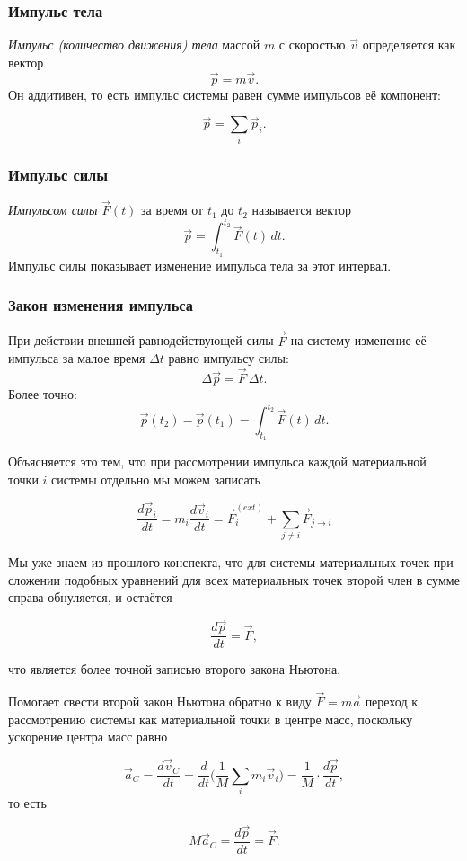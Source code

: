 \documentclass[12pt, a4paper]{article}%
\begin{document}
\subsubsection*{Импульс тела}
\textit{Импульс (количество движения) тела} массой $m$ с скоростью $\vec v$ определяется как вектор
\[
\vec p = m\vec v.
\]
Он аддитивен, то есть импульс системы равен сумме импульсов её компонент:

\[
\vec p = \sum_i \vec p_i.
\]

\subsubsection*{Импульс силы}
\textit{Импульсом силы} $\vec F(t)$ за время от $t_1$ до $t_2$ называется вектор
\[
\vec p = \int_{t_1}^{t_2} \vec F(t)\,dt.
\]
Импульс силы показывает изменение импульса тела за этот интервал.

\subsubsection*{Закон изменения импульса}
При действии внешней равнодействующей силы $\vec F$ на систему изменение её импульса за малое время $\Delta t$ равно импульсу силы:
\[
\Delta\vec p = \vec F\,\Delta t.
\]
Более точно:
\[
\vec p(t_2) - \vec p(t_1) = \int_{t_1}^{t_2} \vec F(t)\,dt.
\]

Объясняется это тем, что при рассмотрении импульса каждой материальной точки $i$ системы отдельно мы можем записать

\[
\frac{d\vec p_i}{dt} = m_i\frac{d\vec v_i}{dt} = \vec F_i^{(ext)}+\sum_{j \neq i} \vec F_{j\rightarrow i}
\]

Мы уже знаем из прошлого конспекта, что для системы материальных точек при сложении подобных уравнений для всех материальных точек второй член в сумме справа обнуляется, и остаётся

\[
\frac{d\vec p}{dt} = \vec F,
\]

что является более точной записью второго закона Ньютона.

Помогает свести второй закон Ньютона обратно к виду $\vec F = m\vec a$ переход к рассмотрению системы как материальной точки в центре масс, поскольку ускорение центра масс равно

\[
\vec a_C = \frac{d\vec v_C}{dt} = \frac{d}{dt}\big(\frac{1}{M}\sum_i m_i\vec v_i\bigr) = \frac1M \cdot\frac{d\vec p}{dt}, 
\]
то есть

\[
M\vec a_C = \frac{d\vec p}{dt} = \vec F.
\]
\end{document}
